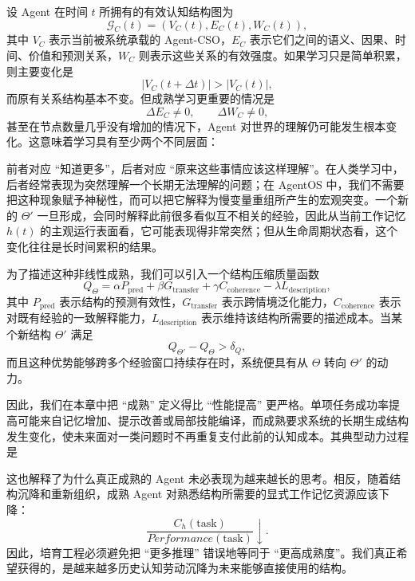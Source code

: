 设 Agent 在时间 $t$ 所拥有的有效认知结构图为
\[
\mathcal G_C(t)=
\left(
V_C(t),E_C(t),W_C(t)
\right),
\]
其中 $V_C$ 表示当前被系统承载的 Agent-CSO，$E_C$ 表示它们之间的语义、因果、时间、价值和预测关系，$W_C$ 则表示这些关系的有效强度。如果学习只是简单积累，则主要变化是
\[
|V_C(t+\Delta t)|>|V_C(t)|,
\]
而原有关系结构基本不变。但成熟学习更重要的情况是
\[
\Delta E_C\neq 0,
\qquad
\Delta W_C\neq 0,
\]
甚至在节点数量几乎没有增加的情况下，Agent 对世界的理解仍可能发生根本变化。这意味着学习具有至少两个不同层面：
\begin{statementbox}
\centering
{}
\end{statementbox}

前者对应 ``知道更多''，后者对应 ``原来这些事情应该这样理解''。在人类学习中，后者经常表现为突然理解一个长期无法理解的问题；在 AgentOS 中，我们不需要把这种现象赋予神秘性，而可以把它解释为慢变量重组所产生的宏观突变。一个新的 $\Theta'$ 一旦形成，会同时解释此前很多看似互不相关的经验，因此从当前工作记忆 $h(t)$ 的主观运行表面看，它可能表现得非常突然；但从生命周期状态看，这个变化往往是长时间累积的结果。

为了描述这种非线性成熟，我们可以引入一个结构压缩质量函数
\[
Q_{\Theta}
=
\alpha P_{\mathrm{pred}}
+
\beta G_{\mathrm{transfer}}
+
\gamma C_{\mathrm{coherence}}
-
\lambda L_{\mathrm{description}},
\]
其中 $P_{\mathrm{pred}}$ 表示结构的预测有效性，$G_{\mathrm{transfer}}$ 表示跨情境泛化能力，$C_{\mathrm{coherence}}$ 表示对既有经验的一致解释能力，$L_{\mathrm{description}}$ 表示维持该结构所需要的描述成本。当某个新结构 $\Theta'$ 满足
\[
Q_{\Theta'}-Q_{\Theta}>\delta_Q,
\]
而且这种优势能够跨多个经验窗口持续存在时，系统便具有从 $\Theta$ 转向 $\Theta'$ 的动力。

因此，我们在本章中把 ``成熟'' 定义得比 ``性能提高'' 更严格。单项任务成功率提高可能来自记忆增加、提示改善或局部技能编译，而成熟要求系统的长期生成结构发生变化，使未来面对一类问题时不再重复支付此前的认知成本。其典型动力过程是
\begin{statementbox}
\centering
{}
\end{statementbox}
这也解释了为什么真正成熟的 Agent 未必表现为越来越长的思考。相反，随着结构沉降和重新组织，成熟 Agent 对熟悉结构所需要的显式工作记忆资源应该下降：
\[
\frac{
C_h(\mathrm{task})
}{
Performance(\mathrm{task})
}
\downarrow.
\]
因此，培育工程必须避免把 ``更多推理'' 错误地等同于 ``更高成熟度''。我们真正希望获得的，是越来越多历史认知劳动沉降为未来能够直接使用的结构。

